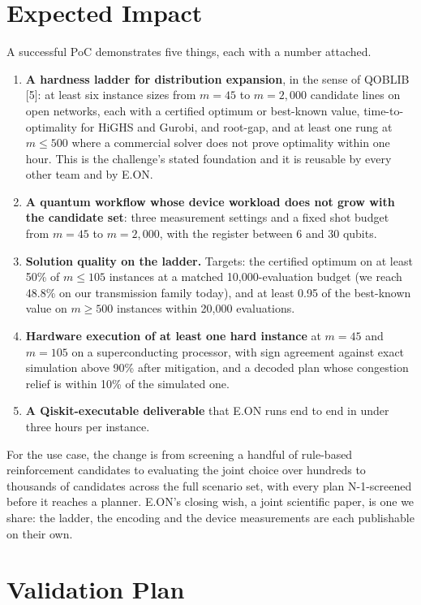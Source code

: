 \documentclass[10pt,a4paper]{article}
\begin{document}
\section{Expected Impact}

A successful PoC demonstrates five things, each with a number attached.
\begin{enumerate}
\item \textbf{A hardness ladder for distribution expansion}, in the sense of
QOBLIB [5]: at least six instance sizes from $m=45$ to $m=2{,}000$ candidate
lines on open networks, each with a certified optimum or best-known value,
time-to-optimality for HiGHS and Gurobi, and root-gap, and at least one rung
at $m\le500$ where a commercial solver does not prove optimality within one
hour. This is the challenge's stated foundation and it is reusable by every
other team and by E.ON.
\item \textbf{A quantum workflow whose device workload does not grow with the
candidate set}: three measurement settings and a fixed shot budget from
$m=45$ to $m=2{,}000$, with the register between 6 and 30 qubits.
\item \textbf{Solution quality on the ladder.} Targets: the certified optimum
on at least 50\% of $m\le105$ instances at a matched 10,000-evaluation budget
(we reach 48.8\% on our transmission family today), and at least 0.95 of the
best-known value on $m\ge500$ instances within 20,000 evaluations.
\item \textbf{Hardware execution of at least one hard instance} at $m=45$ and
$m=105$ on a superconducting processor, with sign agreement against exact
simulation above 90\% after mitigation, and a decoded plan whose congestion
relief is within 10\% of the simulated one.
\item \textbf{A Qiskit-executable deliverable} that E.ON runs end to end in
under three hours per instance.
\end{enumerate}
For the use case, the change is from screening a handful of rule-based
reinforcement candidates to evaluating the joint choice over hundreds to
thousands of candidates across the full scenario set, with every plan
N-1-screened before it reaches a planner. E.ON's closing wish, a joint
scientific paper, is one we share: the ladder, the encoding and the device
measurements are each publishable on their own.

\section{Validation Plan}
\end{document}
